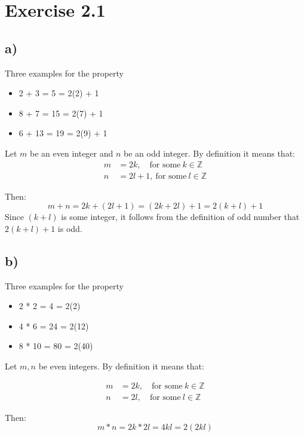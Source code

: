 \documentclass{article}
\begin{document}
\section*{Exercise 2.1}
\subsection*{a)}
Three examples for the property

\begin{itemize}
	\item 2 + 3 = 5 = 2(2) + 1
	\item 8 + 7 = 15 = 2(7) + 1
	\item 6 + 13 = 19 = 2(9) + 1
\end{itemize}

Let $m$ be an even integer and $n$ be an odd integer. By definition it means
that:
\begin{align*}
	m &= 2k, \quad \mbox{for some}\ k \in \mathbb{Z} \\	
	n &= 2l + 1, \ \mbox{for some}\ l \in \mathbb{Z}
\end{align*}

Then:
\begin{equation*}
	m + n = 2k + (2l + 1) = (2k + 2l) + 1 = 2(k+l) + 1
\end{equation*}
\noindent
Since $(k+l)$ is some integer, it follows from the definition of odd number
that $2(k+l) + 1$ is odd.

\subsection*{b)}


Three examples for the property

\begin{itemize}
	\item 2 * 2 = 4 = 2(2)
	\item 4 * 6 = 24 = 2(12)
	\item 8 * 10 = 80 = 2(40)
\end{itemize}

Let $m,n$ be even integers. By definition it means that:

\begin{align*}
	m &= 2k, \quad \mbox{for some}\ k \in \mathbb{Z} \\	
	n &= 2l, \quad \mbox{for some}\ l \in \mathbb{Z}
\end{align*}

Then:
\begin{equation*}
	m * n = 2k * 2l = 4kl = 2(2kl)
\end{equation*}
\end{document}
